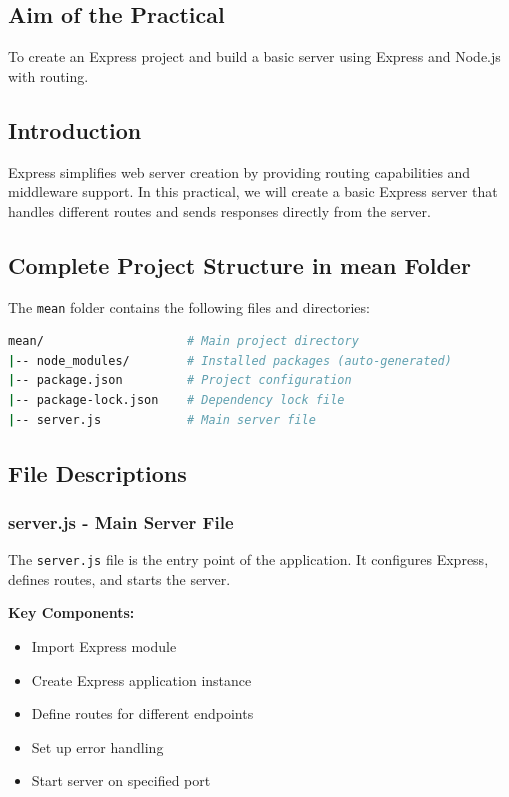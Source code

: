 \documentclass[12pt,a4paper]{article}
\begin{document}
\subsection{Aim of the Practical}
To create an Express project and build a basic server using Express and Node.js with routing.

\subsection{Introduction}
Express simplifies web server creation by providing routing capabilities and middleware support. In this practical, we will create a basic Express server that handles different routes and sends responses directly from the server.

\subsection{Complete Project Structure in mean Folder}

The \texttt{mean} folder contains the following files and directories:

\begin{lstlisting}[language=bash]
mean/                    # Main project directory
|-- node_modules/        # Installed packages (auto-generated)
|-- package.json         # Project configuration
|-- package-lock.json    # Dependency lock file
|-- server.js            # Main server file
\end{lstlisting}

\subsection{File Descriptions}

\subsubsection{server.js - Main Server File}

The \texttt{server.js} file is the entry point of the application. It configures Express, defines routes, and starts the server.

\textbf{Key Components:}
\begin{itemize}
    \item Import Express module
    \item Create Express application instance
    \item Define routes for different endpoints
    \item Set up error handling
    \item Start server on specified port
\end{itemize}
\end{document}
